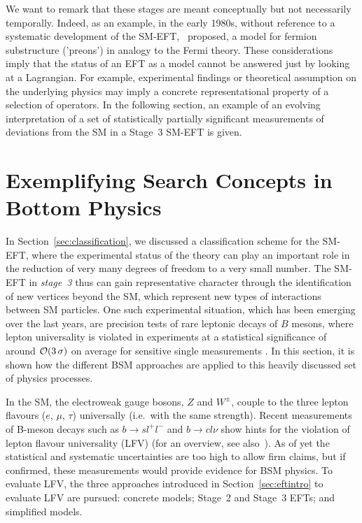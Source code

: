 We want to remark that these stages are meant conceptually but not necessarily temporally.
Indeed, as an example, in the early 1980s, without reference to
a systematic development of the SM-EFT,~\citep{Eichten:1983hw} proposed,
a model for fermion substructure ('preons') in analogy to the Fermi theory.
These considerations imply that the status of an EFT as
a model cannot be answered just by looking at a Lagrangian. 
For example, experimental findings or theoretical assumption on the underlying physics
may imply a concrete representational property of a selection of operators.
In the following section, an example of an evolving interpretation of a set of statistically partially significant measurements of deviations from the SM in a Stage~3 SM-EFT is given.

\section{Exemplifying Search Concepts in Bottom Physics}\label{sec:BphysicsConcepts}

In Section~\ref{sec:classification}, we discussed a classification
scheme for the SM-EFT, where the experimental status of the theory can
play an important role in the reduction of very many degrees of
freedom to a very small number. The SM-EFT in \emph{stage~3} thus can
gain representative character through the identification of new
vertices beyond the SM, which represent new types of interactions
between SM particles. One such experimental situation, which has been
emerging over the last years, are precision tests of rare leptonic
decays of $B$ mesons, where lepton universality is
violated in experiments
at a statistical significance of around ${\cal O}(3\,\sigma)$ on
average for sensitive single measurements \citep{Aaij:2015oid,Aaij:2017vbb,Aaij:2019wad,Abdesselam:2019dgh,Abdesselam:2019wac,Buttazzo:2017ixm}.
In this section, it is shown how the different BSM approaches are applied to this heavily discussed set of physics processes.

In the SM, the electroweak gauge bosons, $Z$ and $W^\pm$, couple to
the three lepton flavours ($e$, $\mu$, $\tau$) universally (i.e.\ with
the same strength).  Recent measurements of B-meson decays such as
$b \to sl^+l^-$ and $b \to c l \nu$ show hints for the violation of
lepton flavour universality (LFV) (for an overview, see
also~\citep{Albrecht:2018frt}).  As of yet the statistical and systematic
uncertainties are too high to allow firm claims, but if confirmed,
these measurements would provide evidence for BSM physics. To evaluate
LFV, the three approaches introduced in
Section~\ref{sec:eftintro} to evaluate LFV are pursued: concrete
models; Stage~2 and Stage~3 EFTs; and
simplified models. 

